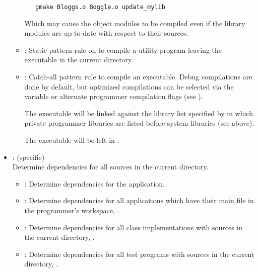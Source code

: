 \begin{itemize}
\begin{itemize}
\begin{verbatim}
   gmake Bloggs.o Boggle.o update_mylib
\end{verbatim}

      \noindent
      Which may cause the object modules to be compiled even if the library
      modules are up-to-date with respect to their sources.
   \item
      : Static pattern rule on  to compile a
      utility program leaving the executable in the current directory.
   \item
      : Catch-all pattern rule to compile an executable.  Debug
      compilations are done by default, but optimized compilations can be
      selected via the  variable or alternate programmer compilation
      flags (see ).

      The executable will be linked against the library list specified by
       in which private programmer libraries are listed
      before system libraries (see above).

      The executable will be left in .
   \end{itemize}

\item
    : (specific)
   \\ Determine dependencies for all sources in the current directory.
   \begin{itemize}
   \item
      : Determine dependencies for the application.
   \item
      : Determine dependencies for all applications which have their
      main  file in the programmer's workspace, .
   \item
      : Determine dependencies for all class implementations with
      sources in the current directory, .
   \item
      : Determine dependencies for all test programs with sources in
      the current directory, .
   \end{itemize}


\end{itemize}

